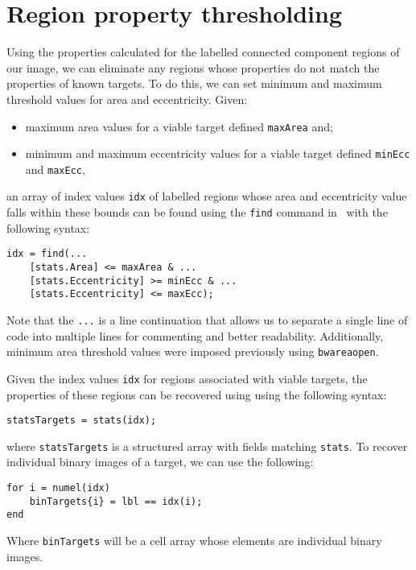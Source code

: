 \documentclass{tufte-handout}
\begin{document}
\section{Region property thresholding}
Using the properties calculated for the labelled connected component regions of our image, we can eliminate any regions whose properties do not match the properties of known targets. To do this, we can set minimum and maximum threshold values for area and eccentricity. Given:
\begin{itemize}
\item maximum area values for a viable target defined \lstinline{maxArea} and;
\item minimum and maximum eccentricity values for a viable target defined \lstinline{minEcc} and \lstinline{maxEcc},
\end{itemize}
an array of index values \lstinline{idx} of labelled regions whose area and eccentricity value falls within these bounds can be found using the \lstinline{find} command in \Matlab\ with the following syntax:
\begin{lstlisting}[style=usnaMatlab]
idx = find(...
	[stats.Area] <= maxArea & ... 
	[stats.Eccentricity] >= minEcc & ...
	[stats.Eccentricity] <= maxEcc);
\end{lstlisting}
Note that the \lstinline{...} is a line continuation that allows us to separate a single line of code into multiple lines for commenting and better readability. Additionally, minimum area threshold values were imposed previously using \lstinline{bwareaopen}.

Given the index values \lstinline{idx} for regions associated with viable targets, the properties of these regions can be recovered using using the following syntax:
\begin{lstlisting}[style=usnaMatlab]
statsTargets = stats(idx);
\end{lstlisting}
where \lstinline{statsTargets} is a structured array with fields matching \lstinline{stats}. To recover individual binary images of a target, we can use the following:
\begin{lstlisting}[style=usnaMatlab]
for i = numel(idx)
	binTargets{i} = lbl == idx(i);
end
\end{lstlisting}
Where \lstinline{binTargets} will be a cell array whose elements are individual binary images.
\end{document}
